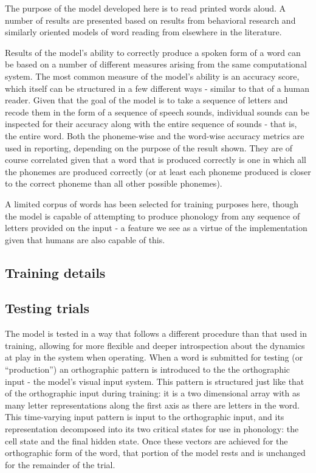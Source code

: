 \documentclass[
  american,
  man,floatsintext]{apa6}
\begin{document}
The purpose of the model developed here is to read printed words aloud. A number of results are presented based on results from behavioral research and similarly oriented models of word reading from elsewhere in the literature.

Results of the model's ability to correctly produce a spoken form of a word can be based on a number of different measures arising from the same computational system. The most common measure of the model's ability is an accuracy score, which itself can be structured in a few different ways - similar to that of a human reader. Given that the goal of the model is to take a sequence of letters and recode them in the form of a sequence of speech sounds, individual sounds can be inspected for their accuracy along with the entire sequence of sounds - that is, the entire word. Both the phoneme-wise and the word-wise accuracy metrics are used in reporting, depending on the purpose of the result shown. They are of course correlated given that a word that is produced correctly is one in which all the phonemes are produced correctly (or at least each phoneme produced is closer to the correct phoneme than all other possible phonemes).

A limited corpus of words has been selected for training purposes here, though the model is capable of attempting to produce phonology from any sequence of letters provided on the input - a feature we see as a virtue of the implementation given that humans are also capable of this.

\hypertarget{training-details}{%
\subsection{Training details}\label{training-details}}

\hypertarget{testing-trials}{%
\subsection{Testing trials}\label{testing-trials}}

The model is tested in a way that follows a different procedure than that used in training, allowing for more flexible and deeper introspection about the dynamics at play in the system when operating. When a word is submitted for testing (or ``production'') an orthographic pattern is introduced to the the orthographic input - the model's visual input system. This pattern is structured just like that of the orthographic input during training: it is a two dimensional array with as many letter representations along the first axis as there are letters in the word. This time-varying input pattern is input to the orthographic input, and its representation decomposed into its two critical states for use in phonology: the cell state and the final hidden state. Once these vectors are achieved for the orthographic form of the word, that portion of the model rests and is unchanged for the remainder of the trial.
\end{document}
